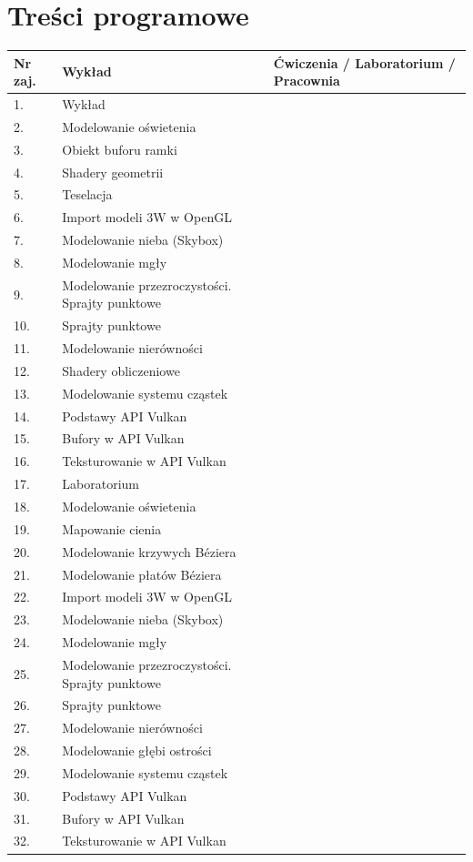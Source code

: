 \documentclass[12pt, a4paper]{article}
\begin{document}
\section{Treści programowe}

\begin{longtable}{|p{1.5cm}|p{6.5cm}|p{6.5cm}|}
\hline
\textbf{Nr zaj.} & \textbf{Wykład} & \textbf{Ćwiczenia / Laboratorium / Pracownia} \\\hline
\endhead
  \hline
  1. & Wykład &  \\
  \hline
  2. & Modelowanie oświetenia &  \\
  \hline
  3. & Obiekt buforu ramki &  \\
  \hline
  4. & Shadery geometrii &  \\
  \hline
  5. & Teselacja &  \\
  \hline
  6. & Import modeli 3W w OpenGL &  \\
  \hline
  7. & Modelowanie nieba (Skybox) &  \\
  \hline
  8. & Modelowanie mgły &  \\
  \hline
  9. & Modelowanie przezroczystości. Sprajty punktowe &  \\
  \hline
  10. & Sprajty punktowe &  \\
  \hline
  11. & Modelowanie nierówności &  \\
  \hline
  12. & Shadery obliczeniowe &  \\
  \hline
  13. & Modelowanie systemu cząstek &  \\
  \hline
  14. & Podstawy API Vulkan &  \\
  \hline
  15. & Bufory w API Vulkan &  \\
  \hline
  16. & Teksturowanie w API Vulkan &  \\
  \hline
  17. & Laboratorium &  \\
  \hline
  18. & Modelowanie oświetenia &  \\
  \hline
  19. & Mapowanie cienia &  \\
  \hline
  20. & Modelowanie krzywych Béziera &  \\
  \hline
  21. & Modelowanie płatów Béziera &  \\
  \hline
  22. & Import modeli 3W w OpenGL &  \\
  \hline
  23. & Modelowanie nieba (Skybox) &  \\
  \hline
  24. & Modelowanie mgły &  \\
  \hline
  25. & Modelowanie przezroczystości. Sprajty punktowe &  \\
  \hline
  26. & Sprajty punktowe &  \\
  \hline
  27. & Modelowanie nierówności &  \\
  \hline
  28. & Modelowanie głębi ostrości &  \\
  \hline
  29. & Modelowanie systemu cząstek &  \\
  \hline
  30. & Podstawy API Vulkan &  \\
  \hline
  31. & Bufory w API Vulkan &  \\
  \hline
  32. & Teksturowanie w API Vulkan &  \\
  \hline
\end{longtable}
\end{document}

